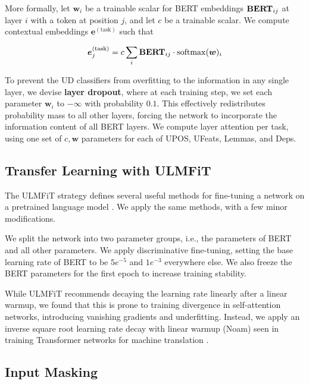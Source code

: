 \documentclass[11pt,a4paper]{article}
\renewcommand{\vec}[1]{\mathbold{#1}}
\newcommand{\mat}[1]{\mathbold{#1}}
\begin{document}
More formally, let $\vec{w}_i$ be a trainable scalar for BERT embeddings $\mat{\operatorname{\bf BERT}}_{ij}$ at layer $i$ with a token at position $j$, and let $c$ be a trainable scalar.
We compute contextual embeddings $\vec{e}^{\operatorname{(task)}}$ such that

\begin{equation} \label{eq:layer-attention}
    \vec{e}_{j}^{\operatorname{(task)}} = c \sum_i \mat{\operatorname{\bf BERT}}_{ij} \cdot \operatorname{softmax}(\vec{w})_i
\end{equation}

To prevent the UD classifiers from overfitting to the information in any single layer, we devise {\bf layer dropout}, where at each training step, we set each parameter $\vec{w}_i$ to $-\infty$ with probability $0.1$.
This effectively redistributes probability mass to all other layers, forcing the network to incorporate the information content of all BERT layers.
We compute layer attention per task, using one set of $c, \vec{w}$ parameters for each of UPOS, UFeats, Lemmas, and Deps.

\subsection{Transfer Learning with ULMFiT} \label{sec:ulmfit}

The ULMFiT strategy defines several useful methods for fine-tuning a network on a pretrained language model \cite{howard2018universal}. We apply the same methods, with a few minor modifications.

We split the network into two parameter groups, i.e., the parameters of BERT and all other parameters.
We apply discriminative fine-tuning, setting the base learning rate of BERT to be $5e^{-5}$ and $1e^{-3}$ everywhere else.
We also freeze the BERT parameters for the first epoch to increase training stability.

While ULMFiT recommends decaying the learning rate linearly after a linear warmup, we found that this is prone to training divergence in self-attention networks, introducing vanishing gradients and underfitting.
Instead, we apply an inverse square root learning rate decay with linear warmup (Noam) seen in training Transformer networks for machine translation \cite{vaswani2017attention}.

\subsection{Input Masking}
\end{document}
